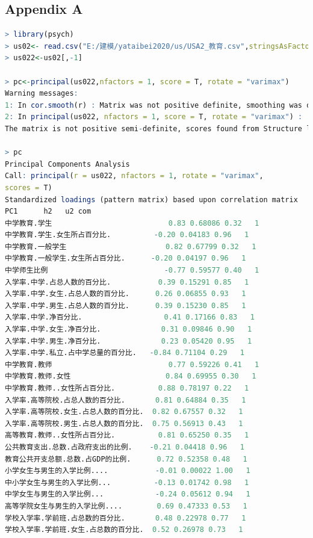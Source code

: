 \documentclass{apmcmthesis}
\begin{document}
\subsection{Appendix A}
\begin{lstlisting}[language=r]
> library(psych)
> us02<- read.csv("E:/建模/yataibei2020/us/USA2_教育.csv",stringsAsFactors = FALSE)
> us022<-us02[,-1]

> pc<-principal(us022,nfactors = 1, score = T, rotate = "varimax")
Warning messages:
1: In cor.smooth(r) : Matrix was not positive definite, smoothing was done
2: In principal(us022, nfactors = 1, score = T, rotate = "varimax") :
The matrix is not positive semi-definite, scores found from Structure loadings

> pc
Principal Components Analysis
Call: principal(r = us022, nfactors = 1, rotate = "varimax", 
scores = T)
Standardized loadings (pattern matrix) based upon correlation matrix
PC1      h2   u2 com
中学教育.学生                           0.83 0.68086 0.32   1
中学教育.学生.女生所占百分比.          -0.20 0.04183 0.96   1
中学教育.一般学生                       0.82 0.67799 0.32   1
中学教育.一般学生.女生所占百分比.      -0.20 0.04197 0.96   1
中学师生比例                           -0.77 0.59577 0.40   1
入学率.中学.占总人数的百分比.           0.39 0.15291 0.85   1
入学率.中学.女生.占总人数的百分比.      0.26 0.06855 0.93   1
入学率.中学.男生.占总人数的百分比.      0.39 0.15230 0.85   1
入学率.中学.净百分比.                   0.41 0.17166 0.83   1
入学率.中学.女生.净百分比.              0.31 0.09846 0.90   1
入学率.中学.男生.净百分比.              0.23 0.05420 0.95   1
入学率.中学.私立.占中学总量的百分比.   -0.84 0.71104 0.29   1
中学教育.教师                           0.77 0.59226 0.41   1
中学教育.教师.女性                      0.84 0.69955 0.30   1
中学教育.教师..女性所占百分比.          0.88 0.78197 0.22   1
入学率.高等院校.占总人数的百分比.       0.81 0.64884 0.35   1
入学率.高等院校.女生.占总人数的百分比.  0.82 0.67557 0.32   1
入学率.高等院校.男生.占总人数的百分比.  0.75 0.56913 0.43   1
高等教育.教师..女性所占百分比.          0.81 0.65250 0.35   1
公共教育支出.总数.占政府支出的比例.    -0.21 0.04418 0.96   1
教育公共开支总额.总数.占GDP的比例.      0.72 0.52358 0.48   1
小学女生与男生的入学比例....           -0.01 0.00022 1.00   1
中小学女生与男生的入学比例...          -0.13 0.01742 0.98   1
中学女生与男生的入学比例...            -0.24 0.05612 0.94   1
高等学院女生与男生的入学比例....        0.69 0.47333 0.53   1
学校入学率.学前班.占总数的百分比.       0.48 0.22978 0.77   1
学校入学率.学前班.女生.占总数的百分比.  0.52 0.26978 0.73   1

\end{lstlisting}
\end{document}
